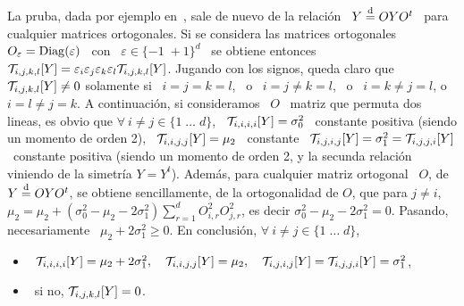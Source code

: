 \begin{itemize}
\begin{itemize}
  La pruba,  dada por ejemplo  en~\cite[\S~13.2]{BilBre99}, sale de nuevo  de la
  relaci\'on \ $Y  \stackrel{\mathrm{d}}{=} O Y O^t$ \ para cualquier  matrices ortogonales. Si se
  considera las  matrices ortogonales  \ $O_\varepsilon =  \operatorname{Diag}(\varepsilon)$ \
  con  \  $\varepsilon  \in  \{-1  \;   +  1  \}^d$  \  se  obtiene  entonces  \
  $\mathcal{T}_{i,j,k,l}[Y]  =  \varepsilon_i  \varepsilon_j \varepsilon_k  \varepsilon_l
  \mathcal{T}_{i,j,k,l}[Y]$.  Jugando  con los  signos, queda claro  que $\mathcal{T}_{i,j,k,l}[Y]
  \ne 0$ solamente si \ $i =  j = k = l$, \ o \ $i = j \ne k  = l$, \ o \ $i = k
  \ne j = l$, o \ $i = l  \ne j = k$.  A continuaci\'on, si consideramos \ $O$ \
  matriz que permuta  dos lineas, es obvio que  $\forall \: i \ne j \in  \{ 1 \;
  \ldots \; d\}$, \ $\mathcal{T}_{i,i,i,i}[Y]  = \sigma_0^2$ \ constante positiva (siendo
  un  momento  de   orden  2),  \  $\mathcal{T}_{i,i,j,j}[Y]  =   \mu_2$  \  constante  \
  $\mathcal{T}_{i,j,i,j}[Y] = \sigma_1^2 =  \mathcal{T}_{i,j,j,i}[Y]$ \ constante positiva (siendo
  un momento de orden 2, y la  secunda relaci\'on viniendo de la simetr\'ia $Y =
  Y^t$).  Adem\'as,  para cualquier  matriz ortogonal  \ $O$, de  $Y \stackrel{\mathrm{d}}{=}  O Y
  O^t$, se  obtiene sencillamente, de la  ortogonalidad de $O$, que  para $j \ne
  i$, $\displaystyle  \mu_2 = \mu_2 +  \left( \sigma_0^2 - \mu_2  - 2 \sigma_1^2
  \right) \sum_{r=1}^d  O_{i,r}^2 O_{j,r}^2$, es  decir $\sigma_0^2 - \mu_2  - 2
  \sigma_1^2 = 0$. Pasando, necesariamente \ $\mu_2 + 2 \sigma_1^2 \ge 0$.
   En  conclusi\'on, $\forall \: i \ne j \in \{ 1 \; \ldots \; d \}$,
  \begin{itemize}
  \item  \ $\mathcal{T}_{i,i,i,i}[Y]  = \mu_2  +  2 \sigma_1^2,  \quad \mathcal{T}_{i,i,j,j}[Y]  =
    \mu_2, \quad \mathcal{T}_{i,j,i,j}[Y] = \mathcal{T}_{i,j,j,i}[Y] = \sigma_1^2$,
  \item \ si no, $\mathcal{T}_{i,j,k,l}[Y] = 0$.
  \end{itemize}

\end{itemize}
\end{itemize}

